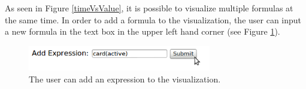 As seen in Figure \ref{timeVsValue}, it is possible to visualize multiple formulas at the same time. In order to add a formula to the visualization, the user can input a new formula in the text box in the upper left hand corner (see Figure \ref{timeVsValueUI}).

\begin{center}
\begin{figure}[h!]
\centering
\includegraphics[width=8cm]{bilder/timeVValueUI.png}
\caption{The user can add an expression to the visualization.}
\label{timeVsValueUI}
\end{figure}
\end{center}